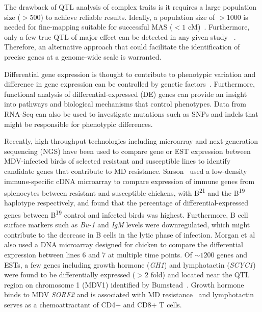 The drawback of QTL analysis of complex traits is it
requires a large population size ($>500$) to achieve
reliable results.  Ideally, a population size of $>1000$ is
needed for fine-mapping suitable for successful MAS ($<1$
cM)~\cite{young1999cautiously}.  Furthermore, only a few true
QTL of major effect can be detected in any given study
~\cite{collard2005introduction}.  Therefore, an alternative
approach that could facilitate the identification of precise
genes at a genome-wide scale is warranted.

Differential gene expression is thought to contribute to
phenotypic variation and difference in gene expression can
be controlled by genetic factors~\cite{morley2004genetic}.
Furthermore, functional analysis of differential-expressed
(DE) genes can provide an insight into pathways and
biological mechanisms that control phenotypes.  Data from
RNA-Seq can also be used to investigate mutations such as
SNPs and indels that might be responsible for phenotypic
differences.

Recently, high-throughput technologies including microarray
and next-generation sequencing (NGS) have been used to
compare gene or EST expression between MDV-infected birds of
selected resistant and susceptible lines to identify
candidate genes that contribute to MD resistance.
Sarson~\cite{sarson2008transcriptional} used a low-density
immune-specific cDNA microarray to compare expression of
immune genes from splenocytes between resistant and
susceptible chickens, with B\textsuperscript{21} and the
B\textsuperscript{19} haplotype respectively, and found that
the percentage of differential-expressed genes between
B\textsuperscript{19} control and infected birds was
highest.  Furthermore, B cell surface markers such as {\em
Bu-1} and {\em IgM} levels were downregulated, which might
contribute to the decrease in B cells in the lytic phase of
infection.   Morgan et al~\cite{morgan2001induction} also used a DNA
microarray designed for chicken to compare the differential
expression between lines 6 and 7 at multiple time points.
Of $\sim1200$ genes and ESTs, a few genes including growth
hormone ({\em GH1}) and lymphotactin ({\em SCYC1}) were
found to be differentially expressed ($>2$ fold) and located
near the QTL region on chromosome 1 (MDV1) identified by
Bumstead~\cite{bumstead1998genomic}.  Growth hormone binds
to MDV {\em SORF2} and is associated with MD
resistance~\cite{liu2001growth} and lymphotactin serves as a
chemoattractant of CD4+ and CD8+ T cells.

